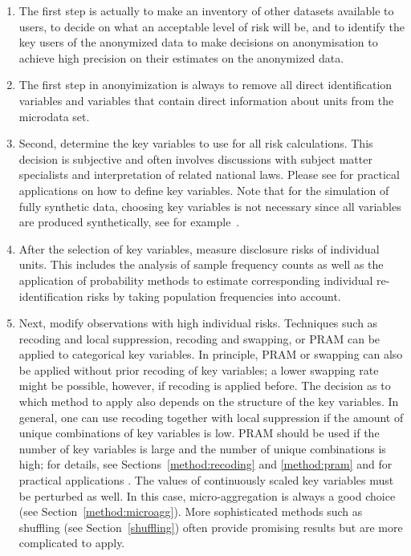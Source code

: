 \documentclass[12pt]{scrartcl}\usepackage[]{graphicx}\usepackage[]{color}
\begin{document}
\begin{enumerate}
\item The first step is actually to make an inventory of other datasets available to users, to decide on what an acceptable level of risk will be, and to identify the key users of the anonymized data to make decisions on anonymisation to achieve high precision on their estimates on the anonymized data.
\item The first step in anonyimization is always to remove all direct identification variables and variables that contain direct information about units from the microdata set.
\item Second, determine the key variables to use for all risk calculations. This decision is subjective and often involves discussions with subject matter specialists and interpretation of related national laws. Please see \cite{caseStudies} for practical applications on how to define key variables. Note that for the simulation of fully synthetic data, choosing key variables is not necessary since all variables are produced synthetically, see for example~\cite{alfons11b}.
\item After the selection of key variables, measure disclosure risks of individual units. This includes the analysis of sample frequency counts as well as the application of probability methods to estimate corresponding individual re-identification risks by taking population frequencies into account.
\item Next, modify observations with high individual risks. Techniques such as recoding and local suppression, recoding and swapping, or PRAM can be applied to categorical key variables. In principle, PRAM or swapping can also be applied without prior recoding of key variables; a lower swapping rate might be possible, however, if recoding is applied before. The decision as to which method to apply also depends on the structure of the key variables. In general, one can use recoding together with local suppression if the amount of unique combinations of key variables is low. PRAM should be used if the number of key variables is large and the number of unique combinations is high; for details, see Sections~\ref{method:recoding} and \ref{method:pram} and for practical applications \cite{caseStudies}. The values of continuously scaled key variables must be perturbed as well. In this case, micro-aggregation is always a good choice (see Section~\ref{method:microagg}). More sophisticated methods such as shuffling (see Section~\ref{shuffling}) often provide promising results but are more complicated to apply.

\end{enumerate}
\end{document}
